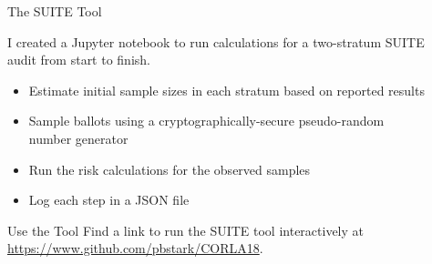 \documentclass[final]{beamer}
\newlength{\sepwid}
\newlength{\onecolwid}
\newlength{\twocolwid}
\begin{document}
\begin{frame}[t]
\begin{columns}[t]
\begin{column}{\sepwid}\end{column} %

\begin{column}{\twocolwid} %

\begin{columns}[t,totalwidth=\twocolwid] %

\begin{column}{\onecolwid}\vspace{-.6in} %


\begin{block}{The SUITE Tool}

I created a Jupyter notebook to run calculations for a two-stratum SUITE audit from start to finish.

\begin{itemize}
\item Estimate initial sample sizes in each stratum based on reported results
\item Sample ballots using a cryptographically-secure pseudo-random number generator
\item Run the risk calculations for the observed samples
\item Log each step in a JSON file 
\end{itemize}
\end{block}

\begin{alertblock}{Use the Tool}
Find a link to run the SUITE tool interactively at \href{https://www.github.com/pbstark/CORLA18}{https://www.github.com/pbstark/CORLA18}. 
\end{alertblock}



\end{column} %

\begin{column}{\onecolwid}\vspace{-.6in} %



\end{column}
\end{columns}
\end{column}
\end{columns}
\end{frame}
\end{document}
